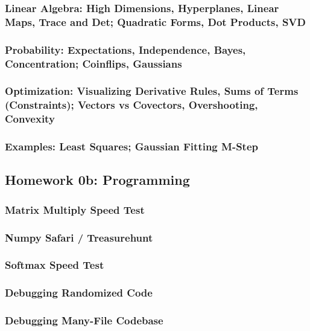 \documentclass[12pt]{article}
\begin{document}
      \subsubsection*{Linear Algebra: High Dimensions, Hyperplanes, Linear Maps, Trace and Det; Quadratic Forms, Dot Products, SVD}
      \subsubsection*{Probability: Expectations, Independence, Bayes, Concentration; Coinflips, Gaussians}
      \subsubsection*{Optimization: Visualizing Derivative Rules, Sums of Terms (Constraints); Vectors vs Covectors, Overshooting, Convexity}
      \subsubsection*{Examples: Least Squares; Gaussian Fitting M-Step}
    \newpage

    \subsection*{Homework 0b: Programming}
      \subsubsection*{Matrix Multiply Speed Test}
      \subsubsection*{Numpy Safari / Treasurehunt}
      \subsubsection*{Softmax Speed Test}
      \subsubsection*{Debugging Randomized Code}
      \subsubsection*{Debugging Many-File Codebase}
    \newpage

\end{document}
